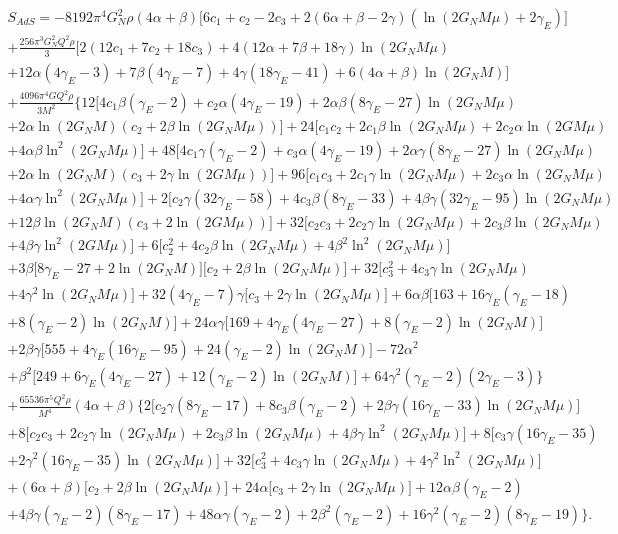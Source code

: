 \documentclass[10pt,a4paper]{article}
\begin{document}
\begin{multline}
   S_{AdS}=-8192\pi^4G^2_N\rho(4\alpha+\beta)\Big[6c_1+c_2-2c_3+2(6\alpha+\beta-2\gamma)\left(\ln(2G_NM\mu)+2\gamma_E\right)\Big]\\
   +\frac{256\pi^3G^2_NQ^2\rho}{3}\Big[2(12c_1+7c_2+18c_3)+4(12\alpha+7\beta+18\gamma)\ln(2G_NM\mu)\\
   +12\alpha(4\gamma_E-3)+7\beta(4\gamma_E-7)+4\gamma(18\gamma_E-41)+6(4\alpha+\beta)\ln(2G_NM)\Big]\\+\frac{4096\pi^4 GQ^2\rho}{3M^2}\bigg\{12\Big[4c_1\beta(\gamma_E-2)+c_2\alpha(4\gamma_E-19)+2\alpha\beta(8\gamma_E-27)\ln(2G_NM\mu)\\
   +2\alpha\ln(2G_NM)\left(c_2+2\beta\ln(2G_NM\mu)\right)\Big]+24\Big[c_1c_2+2c_1\beta\ln(2G_NM\mu)+2c_2\alpha\ln(2GM\mu)\\
   +4\alpha\beta\ln^2(2G_NM\mu)\Big]+48\Big[4c_1\gamma(\gamma_E-2)+c_3\alpha(4\gamma_E-19)+2\alpha\gamma(8\gamma_E-27)\ln(2G_NM\mu)\\
   +2\alpha\ln(2G_NM)\left(c_3+2\gamma\ln(2GM\mu)\right)\Big]+96\Big[c_1c_3+2c_1\gamma\ln(2G_NM\mu)+2c_3\alpha\ln(2G_NM\mu)\\
   +4\alpha\gamma\ln^2(2G_NM\mu)\Big]+2\Big[c_2\gamma(32\gamma_E-58)+4c_3\beta (8\gamma_E-33)+4\beta\gamma(32\gamma_E-95)\ln(2G_NM\mu)\\
   +12\beta\ln(2G_NM)(c_3+2\ln(2GM\mu))\Big]+32\Big[c_2c_3+2c_2\gamma\ln(2G_NM\mu)+2c_3\beta\ln(2G_NM\mu)\\
   +4\beta\gamma\ln^2(2GM\mu)\Big]+6\Big[c^2_2+4c_2\beta\ln(2G_NM\mu)+4\beta^2\ln^2(2G_NM\mu)\Big]\\
   +3\beta\Big[8\gamma_E-27+2\ln(2G_NM)\Big]\Big[c_2+2\beta\ln(2G_NM\mu)\Big]+32\Big[c^2_3+4c_3\gamma\ln(2G_NM\mu)\\
   +4\gamma^2\ln(2G_NM\mu)\Big]+32(4\gamma_E-7)\gamma\Big[c_3+2\gamma\ln(2G_NM\mu)\Big]+6\alpha\beta\Big[163+16\gamma_E(\gamma_E-18)\\
   +8(\gamma_E-2)\ln(2G_NM)\Big]+24\alpha\gamma\Big[169+4\gamma_E(4\gamma_E-27)+8(\gamma_E-2)\ln(2G_NM)\Big]\\
   +2\beta\gamma\Big[555+4\gamma_E(16\gamma_E-95)+24(\gamma_E-2)\ln(2G_NM)\Big]-72\alpha^2\\
   +\beta^2\Big[249+6\gamma_E(4\gamma_E-27)+12(\gamma_E-2)\ln(2G_NM)\Big]+64\gamma^2(\gamma_E-2)(2\gamma_E-3)\bigg\}\\
   +\frac{65536\pi^5Q^2\rho}{M^4}(4\alpha+\beta)\bigg\{2\Big[c_2\gamma(8\gamma_E-17)+8c_3\beta(\gamma_E-2)+2\beta\gamma(16\gamma_E-33)\ln(2G_NM\mu)\Big]\\
   +8\Big[c_2c_3+2c_2\gamma\ln(2G_NM\mu)+2c_3\beta\ln(2G_NM\mu)+4\beta\gamma\ln^2(2G_NM\mu)\Big]+8\Big[c_3\gamma(16\gamma_E-35)\\
   +2\gamma^2(16\gamma_E-35)\ln(2G_NM\mu)\Big]+32\Big[c^2_3+4c_3\gamma\ln(2G_NM\mu)+4\gamma^2\ln^2(2G_NM\mu)\Big]\\
   +(6\alpha+\beta)\Big[c_2+2\beta\ln(2G_NM\mu)\Big]+24\alpha\Big[c_3+2\gamma\ln(2G_NM\mu)\Big]+12\alpha\beta(\gamma_E-2)\\
   +4\beta\gamma(\gamma_E-2)(8\gamma_E-17)+48\alpha\gamma(\gamma_E-2)
   +2\beta^2(\gamma_E-2)+16\gamma^2(\gamma_E-2)(8\gamma_E-19)\bigg\}.
\end{multline}
\end{document}
